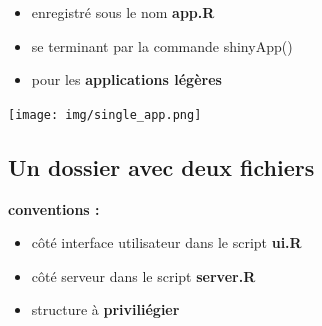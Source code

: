 \documentclass[
]{article}
\newenvironment{Shaded}{\begin{snugshade}}{\end{snugshade}}
\newcommand{\AttributeTok}[1]{\textcolor[rgb]{0.13,0.29,0.53}{#1}}
\newcommand{\ControlFlowTok}[1]{\textcolor[rgb]{0.13,0.29,0.53}{\textbf{#1}}}
\newcommand{\DecValTok}[1]{\textcolor[rgb]{0.00,0.00,0.81}{#1}}
\newcommand{\FunctionTok}[1]{\textcolor[rgb]{0.13,0.29,0.53}{\textbf{#1}}}
\newcommand{\NormalTok}[1]{#1}
\newcommand{\OtherTok}[1]{\textcolor[rgb]{0.56,0.35,0.01}{#1}}
\newcommand{\SpecialCharTok}[1]{\textcolor[rgb]{0.81,0.36,0.00}{\textbf{#1}}}
\newcommand{\StringTok}[1]{\textcolor[rgb]{0.31,0.60,0.02}{#1}}
\providecommand{\tightlist}{%
  \setlength{\itemsep}{0pt}\setlength{\parskip}{0pt}}
\begin{document}
\begin{itemize}
\tightlist
\item
  enregistré sous le nom \textbf{app.R}
\item
  se terminant par la commande shinyApp()
\item
  pour les \textbf{applications légères}
\end{itemize}

\texttt{[image: img/single\_app.png]}

\begin{Shaded}
\end{Shaded}

\hypertarget{un-dossier-avec-deux-fichiers}{%
\subsection{Un dossier avec deux
fichiers}\label{un-dossier-avec-deux-fichiers}}

\textbf{conventions :}

\begin{itemize}
\tightlist
\item
  côté interface utilisateur dans le script \textbf{ui.R}
\item
  côté serveur dans le script \textbf{server.R}
\item
  structure à \textbf{priviliégier}
\end{itemize}
\end{document}
